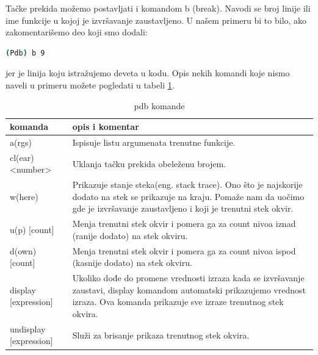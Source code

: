\documentclass[a4paper]{article}
\begin{document}
Tačke prekida možemo postavljati i komandom b (break). Navodi se broj linije ili ime funkcije u kojoj je izvršavanje zaustavljeno. U našem primeru bi to bilo, ako zakomentarišemo deo koji smo dodali:
\begin{lstlisting}[language = bash, caption={Na liniji 9 postavljamo tačku prekida}]
(Pdb) b 9 
\end{lstlisting}
jer je linija koju istražujemo deveta u kodu.
Opis nekih komandi koje nismo naveli u primeru možete pogledati u tabeli \ref{tab:tabela1}.

\begin{table}[h!]
\begin{center}
\caption{pdb komande}
 \begin{tabular}{||p{4cm} p{7cm}||} 
 \hline
  komanda &      opis i komentar \\ [2.0ex] 
 \hline\hline
  a(rgs) & Ispisuje listu argumenata trenutne funkcije.  \\  [2ex]   
 \hline
 cl(ear) <number> & Uklanja tačku prekida obeleženu brojem.  \\ [2ex]
 \hline
 w(here) & Prikazuje stanje steka(eng. stack trace). Ono što je najskorije dodato na stek se prikazuje na kraju. Pomaže nam da uočimo gde je izvršavanje zaustavljeno i koji je trenutni stek okvir. \\ [2ex]
 \hline
 u(p) [count] & Menja trenutni stek okvir i pomera ga za count nivoa iznad (ranije dodato) na stek okviru.  \\ [2ex]
  \hline
 d(own) [count] & Menja trenutni stek okvir i pomera ga za count nivoa ispod (kasnije dodato) na stek okviru.  \\ [2ex] 
 \hline
  \hline
 display [expression] & Ukoliko dođe do promene vrednosti izraza kada se izvršavanje zaustavi, display komandom automatski prikazujemo vrednost izraza. Ova komanda prikazuje sve izraze trenutnog stek okvira.\\ [2ex] 
 \hline
 \hline
 undisplay [expression] & Služi za brisanje prikaza trenutnog stek okvira.  \\ [2ex] 
 \hline
\end{tabular}
\label{tab:tabela1}
\end{center}
\end{table}
\end{document}
